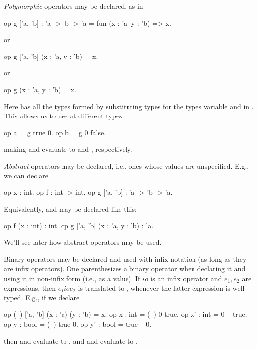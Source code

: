 \emph{Polymorphic} operators may be declared, as in
\begin{easycrypt}{}{}
op g ['a, 'b] : 'a -> 'b -> 'a = fun (x : 'a, y : 'b) => x.
\end{easycrypt}
or
\begin{easycrypt}{}{}
op g ['a, 'b] (x : 'a, y : 'b) = x.
\end{easycrypt}
or
\begin{easycrypt}{}{}
op g (x : 'a, y : 'b) = x.
\end{easycrypt}
Here  has all the types formed
by substituting types for the types variable  and 
in . This allows us to use  at different
types
\begin{easycrypt}{}{}
op a = g true 0.
op b = g 0 false.
\end{easycrypt}
making  and  evaluate to  and , respectively.

\emph{Abstract} operators may be declared, i.e., ones whose values
are unspecified. E.g., we can declare
\begin{easycrypt}{}{}
op x : int.
op f : int -> int.
op g ['a, 'b] : 'a -> 'b -> 'a.
\end{easycrypt}
Equivalently,  and  may be declared like this:
\begin{easycrypt}{}{}
op f (x : int) : int.
op g ['a, 'b] (x : 'a, y : 'b) : 'a.
\end{easycrypt}
We'll see later how abstract operators may be used.

Binary operators may be declared and used with infix notation (as long
as they are infix operators). One parenthesizes a binary operator when
declaring it and using it in non-infix form (i.e., as a value).  If
$\mathit{io}$ is an infix operator and $e_1,e_2$ are expressions, then
$e_1\mathbin{\mathit{io}}e_2$ is translated to , whenever the latter expression is
well-typed. E.g., if we declare
\begin{easycrypt}{}{}
op (--) ['a, 'b] (x : 'a) (y : 'b) = x.
op x : int = (--) 0 true.
op x' : int = 0 -- true.
op y : bool = (--) true 0.
op y' : bool = true -- 0.
\end{easycrypt}
then  and  evaluate to , and
 and  evaluate to .

